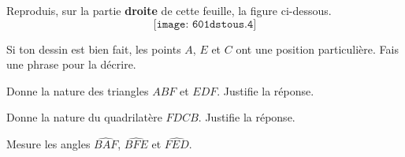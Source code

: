 \begin{myenumerate}
\item Reproduis, sur la partie {\bf droite} de cette feuille, la
  figure ci-dessous.
\[\texttt{[image: 601dstous.4]}\]
\item Si ton dessin est bien fait, les points $A$, $E$ et $C$ ont une
  position particulière. Fais une phrase pour la décrire.
\item Donne la nature des triangles $ABF$ et $EDF$. Justifie la
  réponse.
\item Donne la nature du quadrilatère $FDCB$. Justifie la réponse.
\item Mesure les angles $\widehat{BAF}$, $\widehat{BFE}$ et
  $\widehat{FED}$.
\end{myenumerate}